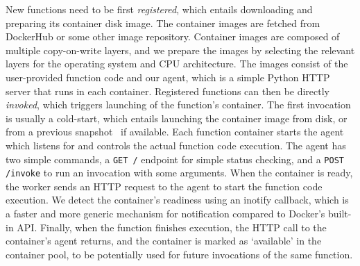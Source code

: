 New functions need to be first \emph{registered}, which entails downloading and preparing its container disk image.
The container images are fetched from DockerHub or some other image repository.
Container images are composed of multiple copy-on-write layers, and we prepare the images by selecting the relevant layers for the operating system and CPU architecture.
The images consist of the user-provided function code and our agent, which is a simple Python HTTP server that runs in each container. 
%
Registered functions can then be directly \emph{invoked}, which triggers launching of the function's container.
The first invocation is usually a cold-start, which entails launching the container image from disk, or from a previous snapshot~\cite{ustiugov2021benchmarking, ao2022faasnap} if available. 
Each function container starts the agent which listens for and controls the actual function code execution. 
The agent has two simple commands, a \texttt{GET /} endpoint for simple status checking, and a \texttt{POST /invoke} to run an invocation with some arguments.
When the container is ready, the worker sends an HTTP request to the agent to start the function code execution. 
We detect the container's readiness using an inotify callback, which is a faster and more generic mechanism for notification compared to Docker's built-in API. 
%
Finally, when the function finishes execution, the HTTP call to the container's agent returns, and the container is marked as  `available' in the container pool, to be potentially used for future invocations of the same function.

